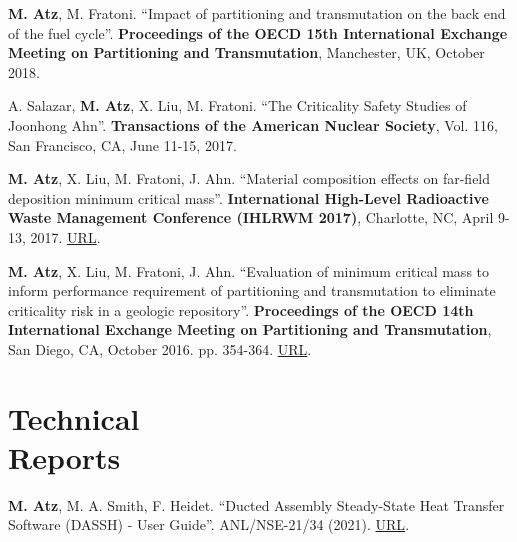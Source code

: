 \documentclass[margin,line]{resume}
\begin{document}
\begin{resume}
\begin{bibenum}
    \item \textbf{M. Atz}, M. Fratoni. ``Impact of partitioning and transmutation on the back end of the fuel cycle''. \textbf{Proceedings of the OECD 15th International Exchange Meeting on Partitioning and Transmutation}, Manchester, UK, October 2018.
    
    \item A. Salazar, \textbf{M. Atz}, X. Liu, M. Fratoni. ``The Criticality Safety Studies of Joonhong Ahn''. \textbf{Transactions of the American Nuclear Society}, Vol. 116, San Francisco, CA, June 11-15, 2017.

    \item \textbf{M. Atz}, X. Liu, M. Fratoni, J. Ahn. ``Material composition effects on far-field deposition minimum critical mass''. \textbf{International High-Level Radioactive Waste Management Conference (IHLRWM 2017)}, Charlotte, NC, April 9-13, 2017. \href{https://www.researchgate.net/profile/Milos-Atz/publication/328150158_Material_composition_effects_on_far-field_deposition_minimum_critical_mass/links/5bbbd7bf299bf1049b75d9bf/Material-composition-effects-on-far-field-deposition-minimum-critical-mass.pdf}{URL}.

    \item \textbf{M. Atz}, X. Liu, M. Fratoni, J. Ahn. ``Evaluation of minimum critical mass to inform performance requirement of partitioning and transmutation to eliminate criticality risk in a geologic repository''. \textbf{Proceedings of the OECD 14th International Exchange Meeting on Partitioning and Transmutation}, San Diego, CA, October 2016. pp. 354-364. \href{https://www.oecd-nea.org/science/docs/2017/nsc-r2017-3.pdf}{URL}.

\end{bibenum}
\section{\mysidestyle Technical\\Reports}

\begin{bibenum}

    \item \textbf{M. Atz}, M. A. Smith, F. Heidet. ``Ducted Assembly Steady-State Heat Transfer Software (DASSH) - User Guide''. ANL/NSE-21/34 (2021). \href{https://www.osti.gov/biblio/1812216-ducted-assembly-steady-state-heat-transfer-software-dassh-user-guide}{URL}.


\end{bibenum}
\end{resume}
\end{document}
